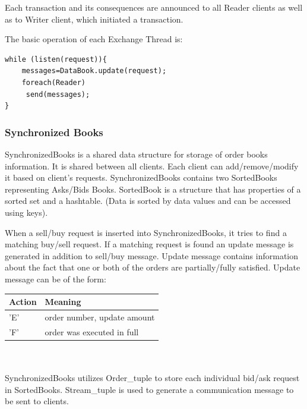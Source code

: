 \documentclass[14pt]{article}
\begin{document}
Each transaction and its consequences are announced to all Reader clients as well as to Writer client, which initiated a transaction. 

The basic operation of each Exchange Thread is:

\begin{verbatim}
while (listen(request)){
	messages=DataBook.update(request);
	foreach(Reader)
	 send(messages);
}
\end{verbatim}


\subsubsection{Synchronized Books}
SynchronizedBooks is a shared data structure for storage of order books information. It is shared between all clients. Each client can add/remove/modify it based on client's requests. SynchronizedBooks contains two SortedBooks representing Asks/Bids Books. SortedBook is a structure that has properties of a sorted set and a hashtable. (Data is sorted by data values and can be accessed using keys).

When a sell/buy request is inserted into SynchronizedBooks, it tries to find a matching buy/sell request. If a matching request is found an update message is generated in addition to sell/buy message. Update message contains information about the fact that one or both of the orders are partially/fully satisfied. Update message can be of the form:


\begin{tabular}{|l|l|}
  \hline
  Action & Meaning \\ \hline
  'E' & order number, update amount \\ \hline
  'F' & order was executed in full \\

  \hline
\end{tabular}
\\
\\
SynchronizedBooks utilizes Order\_tuple to store each individual bid/ask request in SortedBooks. Stream\_tuple is used to generate a communication message to be sent to clients.
\end{document}

